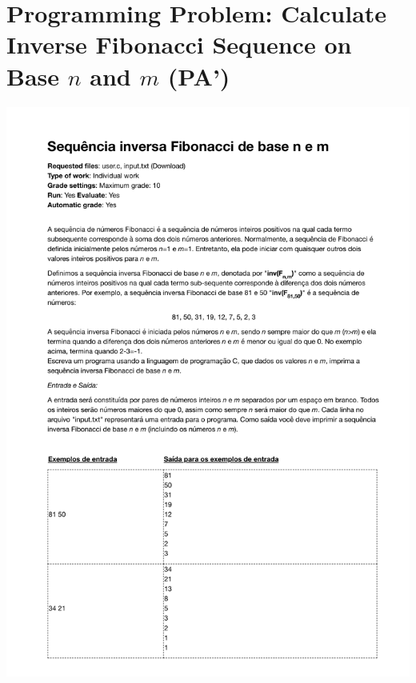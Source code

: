 \section{Programming Problem: Calculate Inverse Fibonacci Sequence on Base $n$ and $m$ (PA')}
\label{annex:pilot-study-pA}
\includegraphics[page=1,width=1\textwidth]{images/annex/pilot-study-pA.pdf}


\newpage
